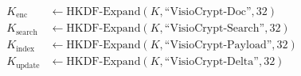 \documentclass[preview,varwidth=88mm]{standalone}
\begin{document}
\begin{align*}
K_{\text{enc}} &\leftarrow \text{HKDF-Expand}(K, \text{``VisioCrypt-Doc''}, 32) \\
K_{\text{search}} &\leftarrow \text{HKDF-Expand}(K, \text{``VisioCrypt-Search''}, 32) \\
K_{\text{index}} &\leftarrow \text{HKDF-Expand}(K, \text{``VisioCrypt-Payload''}, 32) \\
K_{\text{update}} &\leftarrow \text{HKDF-Expand}(K, \text{``VisioCrypt-Delta''}, 32)
\end{align*}
\end{document}
